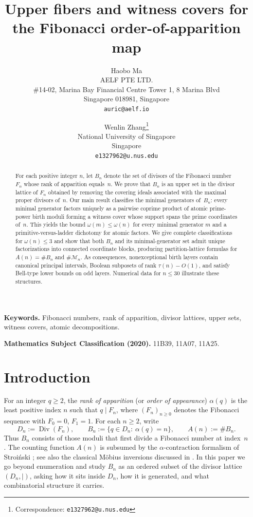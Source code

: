 \documentclass[11pt,letterpaper]{article}
\title{Upper fibers and witness covers for the Fibonacci order-of-apparition map}
\author{
Haobo Ma\\
AELF PTE LTD.\\
\#14-02, Marina Bay Financial Centre Tower 1, 8 Marina Blvd\\
Singapore 018981, Singapore\\
\texttt{auric@aelf.io}
\and
Wenlin Zhang\thanks{Correspondence: \texttt{e1327962@u.nus.edu}}\\
National University of Singapore\\
Singapore\\
\texttt{e1327962@u.nus.edu}
}
\date{}
\numberwithin{equation}{section}
\theoremstyle{plain}
\theoremstyle{definition}
\theoremstyle{remark}
\begin{document}
\maketitle

\begin{abstract}
For each positive integer $n$, let $B_n$ denote the set of divisors of the
Fibonacci number $F_n$ whose rank of apparition equals~$n$. We prove that
$B_n$ is an upper set in the divisor lattice of $F_n$ obtained by removing
the covering ideals associated with the maximal proper divisors of~$n$. Our
main result classifies the minimal generators of~$B_n$: every minimal
generator factors uniquely as a pairwise coprime product of atomic
prime-power birth moduli forming a witness cover whose support spans the prime
coordinates of~$n$. This yields the bound $\omega(m)\le\omega(n)$ for every
minimal generator $m$ and a primitive-versus-ladder dichotomy for atomic
factors. We give complete classifications for $\omega(n)\le 3$ and show that
both $B_n$ and its minimal-generator set admit unique factorizations into
connected coordinate blocks, producing partition-lattice formulas for $A(n) =
\#B_n$ and $\#\mathcal{M}_n$. As consequences, nonexceptional birth layers
contain canonical principal intervals, Boolean subposets of rank $\tau(n) -
O(1)$, and satisfy Bell-type lower bounds on odd layers. Numerical data for
$n\le 30$ illustrate these structures.
\end{abstract}

\medskip
\noindent\textbf{Keywords.} Fibonacci numbers, rank of apparition, divisor
lattices, upper sets, witness covers, atomic decompositions.

\smallskip
\noindent\textbf{Mathematics Subject Classification (2020).}
11B39, 11A07, 11A25.

\section{Introduction}\label{sec:intro}

For an integer $q\ge 2$, the \emph{rank of apparition} (or \emph{order of
appearance}) $\alpha(q)$ is the least positive index $n$ such that $q\mid
F_n$, where $(F_n)_{n\ge 0}$ denotes the Fibonacci sequence with $F_0=0$,
$F_1=1$. For each $n\ge 2$, write
\[
D_n:=\operatorname{Div}(F_n),
\qquad
B_n:=\{q\in D_n:\ \alpha(q)=n\},
\qquad
A(n):=\#B_n.
\]
Thus $B_n$ consists of those moduli that first divide a Fibonacci number at
index~$n$. The counting function $A(n)$ is subsumed by the
$\alpha$-contraction formalism of Stroi\'nski \cite{Stroinski2016AlphaContraction};
see also the classical M\"obius inversions discussed in
\cite{Halton1966DivisibilityFibonacci,FultonMorris1969ArithmeticalFunctions}.
In this paper we go beyond enumeration and study $B_n$ as an
ordered subset of the divisor lattice $(D_n,\mid)$, asking how it sits inside
$D_n$, how it is generated, and what combinatorial structure it carries.
\end{document}
